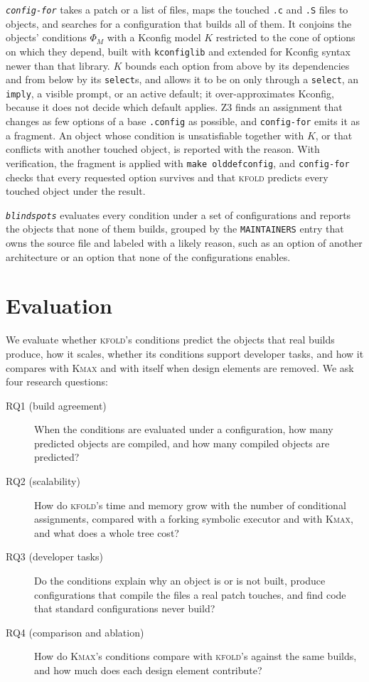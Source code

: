 \documentclass[acmsmall,screen,review]{acmart}
\newcommand{\tool}{\textsc{kfold}\xspace}
\newcommand{\kmax}{\textsc{Kmax}\xspace}
\begin{document}
\emph{\texttt{config-for}} takes a patch or a list of files, maps the touched \texttt{.c} and \texttt{.S} files to objects, and searches for a configuration that builds all of them. It conjoins the objects' conditions $\Phi_M$ with a Kconfig model $K$ restricted to the cone of options on which they depend, built with \texttt{kconfiglib} and extended for Kconfig syntax newer than that library. $K$ bounds each option from above by its dependencies and from below by its \texttt{select}s, and allows it to be on only through a \texttt{select}, an \texttt{imply}, a visible prompt, or an active default; it over-approximates Kconfig, because it does not decide which default applies. Z3 finds an assignment that changes as few options of a base \texttt{.config} as possible, and \texttt{config-for} emits it as a fragment. An object whose condition is unsatisfiable together with $K$, or that conflicts with another touched object, is reported with the reason. With verification, the fragment is applied with \texttt{make olddefconfig}, and \texttt{config-for} checks that every requested option survives and that \tool predicts every touched object under the result.

\emph{\texttt{blindspots}} evaluates every condition under a set of configurations and reports the objects that none of them builds, grouped by the \texttt{MAINTAINERS} entry that owns the source file and labeled with a likely reason, such as an option of another architecture or an option that none of the configurations enables.

\section{Evaluation}
\label{sec:eval}

We evaluate whether \tool's conditions predict the objects that real builds produce, how it scales, whether its conditions support developer tasks, and how it compares with \kmax and with itself when design elements are removed. We ask four research questions:
\begin{description}
\item[RQ1 (build agreement)] When the conditions are evaluated under a configuration, how many predicted objects are compiled, and how many compiled objects are predicted?
\item[RQ2 (scalability)] How do \tool's time and memory grow with the number of conditional assignments, compared with a forking symbolic executor and with \kmax, and what does a whole tree cost?
\item[RQ3 (developer tasks)] Do the conditions explain why an object is or is not built, produce configurations that compile the files a real patch touches, and find code that standard configurations never build?
\item[RQ4 (comparison and ablation)] How do \kmax's conditions compare with \tool's against the same builds, and how much does each design element contribute?
\end{description}
\end{document}
